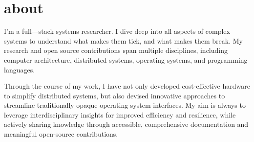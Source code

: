 \section{about}

I'm a full---stack systems researcher. I dive deep into all aspects of complex systems to understand what makes them tick, and what makes them break. My research and open source contributions span multiple disciplines, including computer architecture, distributed systems, operating systems, and programming languages. 

Through the course of my work, I have not only developed cost-effective hardware to simplify distributed systems, but also devised innovative approaches to streamline traditionally opaque operating system interfaces. My aim is always to leverage interdisciplinary insights for improved efficiency and resilience, while actively sharing knowledge through accessible, comprehensive documentation and meaningful open-source contributions.


\clearpage



\clearpage













%



